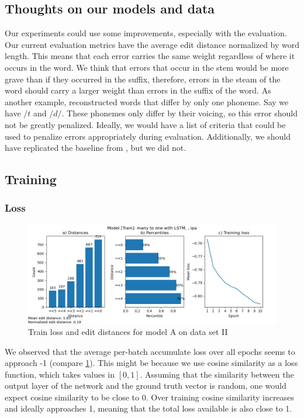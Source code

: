 \subsection{Thoughts on our models and data}
Our experiments could use some improvements, especially with the evaluation. Our current evaluation metrics have the average edit distance normalized by word length. This means that each error carries the same weight regardless of where it occurs in the word. 
We think that errors that occur in the stem would be more grave than if they occurred in the suffix, therefore, errors in the steam of the word should carry a larger weight than errors in the suffix of the word. 
As another example, reconstructed words that differ by only one phoneme. Say we have $/t$ and $/d/$. These phonemes only differ by their voicing, so this error should not be greatly penalized. Ideally, we would have a list of criteria that could be used to penalize errors appropriately during evaluation.
Additionally, we should have replicated the baseline from \cite{meloni2019ab}, but we did not.

\subsection{Training}
\subsubsection{Loss}

\begin{figure}
    \centering
    \includegraphics[width=\textwidth]{many2one_train_ipa.jpg}
    \caption{Train loss and edit distances for model A on data set II}
    \label{fig:loss_curve}
\end{figure}
We observed that the average per-batch accumulate loss over all epochs seems to approach -1 (compare \ref{fig:loss_curve}). This might be because we use cosine similarity as a loss function, which takes values in $[0,1]$. Assuming that the similarity between the output layer of the network and the ground truth vector is random, one would expect cosine similarity to be close to 0. Over training cosine similarity increases and ideally approaches 1, meaning that the total loss available is also close to 1.

